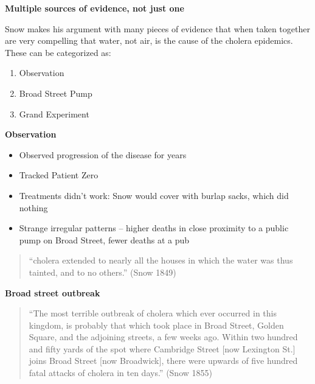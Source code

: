 \documentclass[notes=show]{beamer}
\begin{document}
\begin{frame}[plain]
\begin{center}
\textbf{Multiple sources of evidence, not just one}
\end{center}

Snow makes his argument with many pieces of evidence that when taken together are very compelling that water, not air, is the cause of the cholera epidemics. These can be categorized as:
\begin{enumerate}
\item Observation
\item Broad Street Pump
\item Grand Experiment
\end{enumerate}

\end{frame}


\begin{frame}[plain]
\begin{center}
\textbf{Observation}
\end{center}

\begin{itemize}
\item Observed progression of the disease for years
\item Tracked Patient Zero 
\item Treatments didn't work:  Snow would cover with burlap sacks, which did nothing
\item Strange irregular patterns -- higher deaths in close proximity to a public pump on Broad Street, fewer deaths at a pub
\end{itemize}
\begin{quote}
``cholera extended to nearly all the houses in which the water was thus tainted, and to no others.'' (Snow 1849)
\end{quote}
\end{frame}

\begin{frame}[plain]
\begin{center}
\textbf{Broad street outbreak}
\end{center}

\begin{quote}
``The most terrible outbreak of cholera which ever occurred in this kingdom, is probably that
which took place in Broad Street, Golden Square, and the adjoining streets, a few weeks ago. Within two
hundred and fifty yards of the spot where Cambridge Street [now Lexington St.] joins Broad Street [now
Broadwick], there were upwards of five hundred fatal attacks of cholera in ten days.'' (Snow 1855)
\end{quote}
\end{frame}
\end{document}
